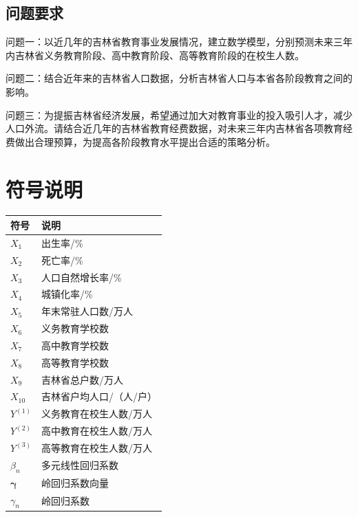 \documentclass[UTF8, zihao=-4]{ctexart}
\begin{document}
	\subsection{问题要求} 
	问题一：以近几年的吉林省教育事业发展情况，建立数学模型，分别预测未来三年内吉林省义务教育阶段、高中教育阶段、高等教育阶段的在校生人数。
	
	问题二：结合近年来的吉林省人口数据，分析吉林省人口与本省各阶段教育之间的影响。
	
	问题三：为提振吉林省经济发展，希望通过加大对教育事业的投入吸引人才，减少人口外流。请结合近几年的吉林省教育经费数据，对未来三年内吉林省各项教育经费做出合理预算，为提高各阶段教育水平提出合适的策略分析。
	
	\section{符号说明}
	\begin{tabular}{@{}p{6cm} p{8cm}@{}}
		\toprule
		\textbf{符号} & \textbf{说明} \\
		\midrule
		$X_1$        & 出生率/\% \\
		$X_2$		 & 死亡率/\% \\
		$X_3$		 & 人口自然增长率/\% \\
		$X_4$		 & 城镇化率/\% \\
		$X_5$		 & 年末常驻人口数/万人 \\
		$X_6$		 & 义务教育学校数  \\
		$X_7$		 & 高中教育学校数  \\
		$X_8$		 & 高等教育学校数  \\
		$X_9$		 & 吉林省总户数/万人  \\
		$X_{10}$		 & 吉林省户均人口/（人/户）  \\
		$Y^{(1)}$    & 义务教育在校生人数/万人 \\
		$Y^{(2)}$    & 高中教育在校生人数/万人 \\
		$Y^{(3)}$    & 高等教育在校生人数/万人 \\
		$\beta_n$ 	 & 多元线性回归系数  \\
		$\bm{\gamma}$ 	 & 岭回归系数向量 \\
		$\gamma_n$     & 岭回归系数  \\
		\bottomrule
	\end{tabular}
	
\end{document}
